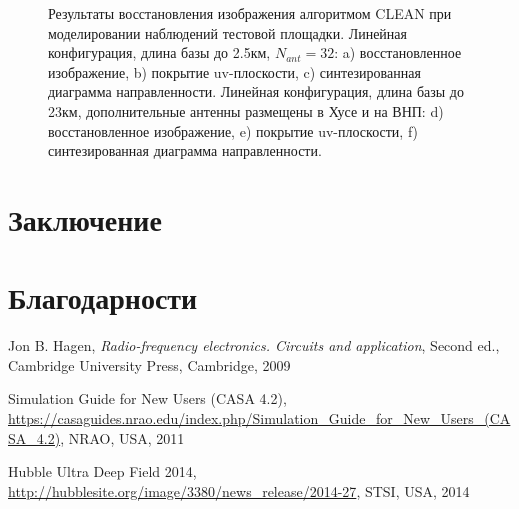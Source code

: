 \documentclass[10pt,a4paper]{article}
\begin{document}
\begin{figure}
\caption{Результаты восстановления изображения алгоритмом CLEAN при моделировании наблюдений тестовой площадки. Линейная конфигурация, длина базы до 2.5км, $N_{ant}=32$: a) восстановленное изображение, b) покрытие uv-плоскости, c) синтезированная диаграмма направленности. Линейная конфигурация, длина базы до 23км, дополнительные антенны размещены в Хусе и на ВНП: d) восстановленное изображение, e) покрытие uv-плоскости, f) синтезированная диаграмма направленности.}
\label{fig:RIF32-reg_n32}
\end{figure}

\section{Заключение}

\section*{Благодарности}


\begin{thebibliography}{1}
 Jon B. Hagen, {\em Radio-frequency electronics. Circuits and application}, Second ed., Cambridge University Press, Cambridge, 2009 %

  Simulation Guide for New Users (CASA 4.2), \url{https://casaguides.nrao.edu/index.php/Simulation_Guide_for_New_Users_(CASA_4.2)}, NRAO, USA, 2011

 Hubble Ultra Deep Field 2014, \url{http://hubblesite.org/image/3380/news_release/2014-27}, STSI, USA, 2014

\end{thebibliography}
\end{document}
